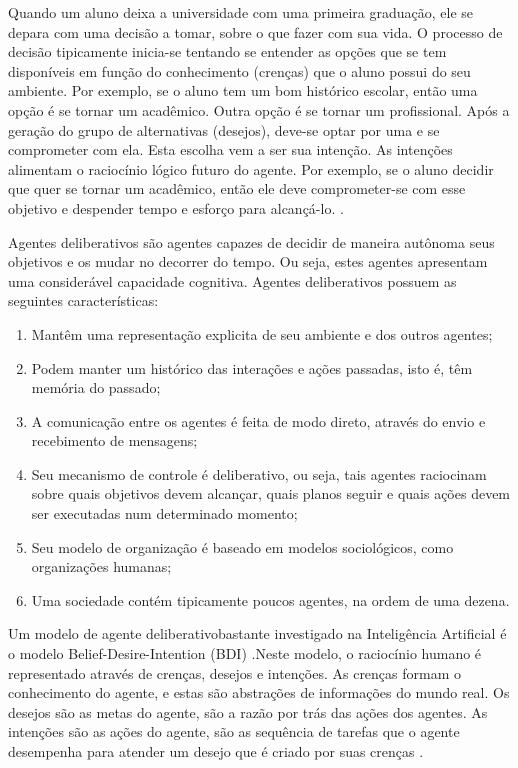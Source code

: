 
Quando um aluno deixa a universidade com uma primeira graduação, ele se depara com uma decisão a tomar, sobre o que fazer com sua vida. O processo de decisão tipicamente inicia-se tentando se entender as opções que se tem disponíveis em função do conhecimento (crenças) que o aluno possui do seu ambiente. Por exemplo, se o aluno tem um bom histórico escolar, então uma opção é se tornar um acadêmico. Outra opção é se tornar um profissional. Após a geração do grupo de alternativas (desejos), deve-se optar por uma e se comprometer com ela. Esta escolha vem a ser sua intenção. As intenções alimentam o raciocínio lógico futuro do agente. Por exemplo, se o aluno decidir que quer se tornar um acadêmico, então ele deve comprometer-se com esse objetivo e despender tempo e esforço para alcançá-lo. .

Agentes deliberativos são agentes capazes de decidir de maneira autônoma seus objetivos e os mudar no decorrer do tempo. Ou seja, estes agentes apresentam uma considerável capacidade cognitiva. Agentes deliberativos possuem as seguintes características:
\begin{citacao}
\begin{enumerate}

	\item Mantêm uma representação explicita de seu ambiente e dos outros agentes;
	\item Podem manter um histórico das interações e ações passadas, isto é, têm memória do passado;
	\item A comunicação entre os agentes é feita de modo direto, através do envio e recebimento de mensagens;
	\item Seu mecanismo de controle é deliberativo, ou seja, tais agentes raciocinam sobre quais objetivos devem alcançar, quais planos seguir e quais ações devem ser executadas num determinado momento;
	\item Seu modelo de organização é baseado em modelos sociológicos, como organizações humanas;
	\item Uma sociedade contém tipicamente poucos agentes, na ordem de uma dezena.
	 \newline {}

\end{enumerate}
\end{citacao}

Um modelo de agente deliberativobastante investigado na Inteligência Artificial é o modelo Belief-Desire-Intention (BDI) .Neste modelo, o raciocínio humano é representado através de crenças, desejos e intenções. As crenças formam o conhecimento do agente, e estas são abstrações de informações do mundo real. Os desejos são as metas do agente, são a razão por trás das ações dos agentes. As intenções são as ações do agente, são as sequência de tarefas que o agente desempenha para atender um desejo que é criado por suas crenças \cite[p. 31]{serrano2011}.

